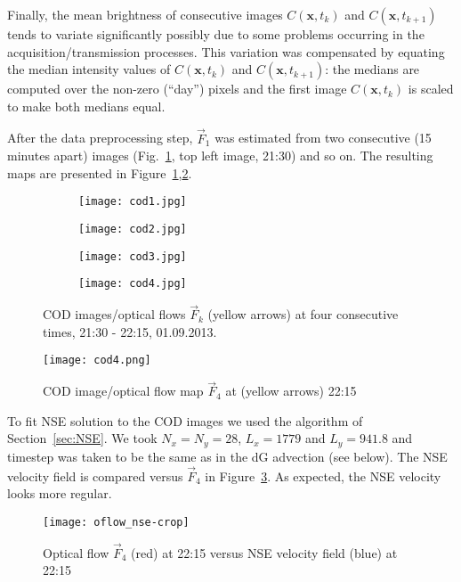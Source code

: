 \documentclass[onecolumn, 12pt, conference]{ieeeconf}
\def\F{\vec{F}}
\begin{document}
Finally, the mean brightness of consecutive images $C(\bm{x},t_{k})$ and $C(\bm{x},t_{k+1})$ tends to variate significantly possibly due to some problems occurring in the acquisition/transmission processes. This variation was compensated by equating the median intensity values of $C(\bm{x},t_{k})$ and $C(\bm{x},t_{k+1})$: the medians are computed over the non-zero (``day'') pixels and the first image $C(\bm{x},t_{k})$ is scaled to make both medians equal.

After the data preprocessing step, $\F_1$ was estimated from two consecutive (15 minutes apart) images (Fig.~\ref{fig:cods}, top left image, 21:30) and so on. The resulting maps are presented in Figure~\ref{fig:cods},\ref{fig:cod1F4}.
\begin{figure}
        \centering
        \begin{subfigure}{}
                \texttt{[image: cod1.jpg]}
        \end{subfigure}%
        \hspace{-7pt}%
        \begin{subfigure}{}
                \texttt{[image: cod2.jpg]}
        \end{subfigure}%
	\vspace{-2pt}
        \begin{subfigure}{}
                \texttt{[image: cod3.jpg]}
        \end{subfigure}%
        \hspace{-10pt}
	 \begin{subfigure}{}
          \texttt{[image: cod4.jpg]}
        \end{subfigure}%
	\caption{COD images/optical flows $\F_k$ (yellow arrows) at four consecutive times, 21:30 - 22:15, 01.09.2013.}
\label{fig:cods}
\end{figure}
\begin{figure}[h]
  \centering
  \texttt{[image: cod4.png]}
  \caption{COD image/optical flow map $\F_4$ at (yellow arrows) 22:15\label{fig:cod1F4}}
\end{figure}

To fit NSE solution to the COD images we used the algorithm of Section~\ref{sec:NSE}. We took $N_x=N_y=28$, $L_x=1779$ and $L_y=941.8$ and timestep was taken to be the same as in the dG advection (see below). The NSE velocity field is compared versus $\F_4$ in Figure~\ref{fig:F4NSE}. As expected, the NSE velocity looks more regular.
\begin{figure}[h]
  \centering
  \texttt{[image: oflow\_nse-crop]}
  \caption{Optical flow $\F_4$ (red) at 22:15 versus NSE velocity field (blue) at 22:15\label{fig:F4NSE}}
\end{figure}
\end{document}
